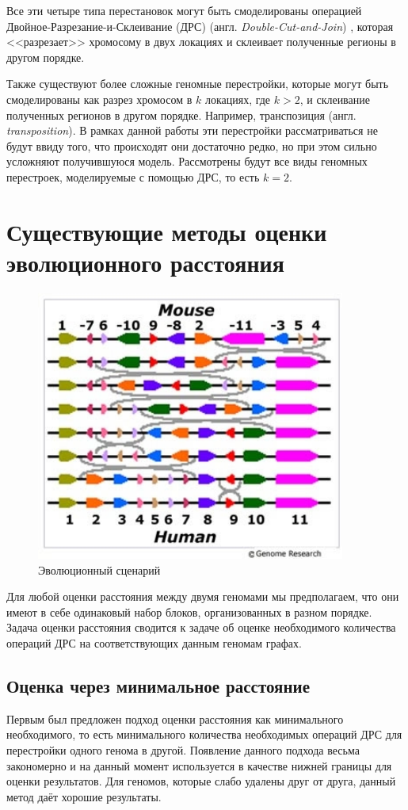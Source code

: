 Все эти четыре типа перестановок могут быть смоделированы операцией Двойное-Разрезание-и-Склеивание (ДРС) (англ. \textit{Double-Cut-and-Join}) \cite{dcj}, которая <<разрезает>> хромосому в двух локациях и склеивает полученные регионы в другом порядке.

Также существуют более сложные геномные перестройки, которые могут быть смоделированы как разрез хромосом в $k$ локациях, где $k>2$, и склеивание полученных регионов в другом порядке.
Например, транспозиция (англ. \textit{transposition}).
В рамках данной работы эти перестройки рассматриваться не будут ввиду того, что происходят они достаточно редко, но при этом сильно усложняют получившуюся модель.
Рассмотрены будут все виды геномных перестроек, моделируемые с помощью ДРС, то есть $k=2$.

\section{Существующие методы оценки эволюционного расстояния}

\begin{figure}[h!]
    \includegraphics[width=4in]{img/mouse_human.jpg}
    \caption{Эволюционный сценарий}
    \label{mouse-human}
\end{figure}

Для любой оценки расстояния между двумя геномами мы предполагаем, что они имеют в себе одинаковый набор блоков, организованных в разном порядке.
Задача оценки расстояния сводится к задаче об оценке необходимого количества операций ДРС на соответствующих данным геномам графах.

\subsection{Оценка через минимальное расстояние}
Первым был предложен подход оценки расстояния как минимального необходимого, то есть минимального количества необходимых операций ДРС для перестройки одного генома в другой.
Появление данного подхода весьма закономерно и на данный момент используется в качестве нижней границы для оценки результатов.
Для геномов, которые слабо удалены друг от друга, данный метод даёт хорошие результаты.

